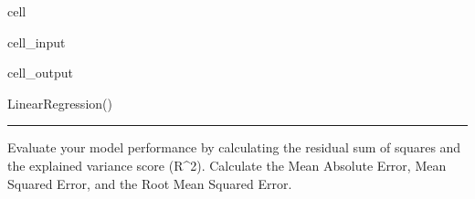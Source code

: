 \documentclass[letterpaper,10pt,english]{sphinxmanual}
\begin{document}
\begin{sphinxuseclass}{cell}
\begin{sphinxuseclass}{cell_input}
\begin{sphinxVerbatim}[commandchars=\\\{\}]
  

  
\end{sphinxVerbatim}

\end{sphinxuseclass}
\begin{sphinxuseclass}{cell_output}
\begin{sphinxVerbatim}[commandchars=\\\{\}]
LinearRegression()
\end{sphinxVerbatim}

\end{sphinxuseclass}
\end{sphinxuseclass}

\bigskip\hrule\bigskip


\sphinxAtStartPar
{}

\sphinxAtStartPar
{}

\sphinxAtStartPar
Evaluate your model performance by calculating the residual sum of squares and the explained variance score (R\textasciicircum{}2). Calculate the Mean Absolute Error, Mean Squared Error, and the Root Mean Squared Error.
\end{document}
